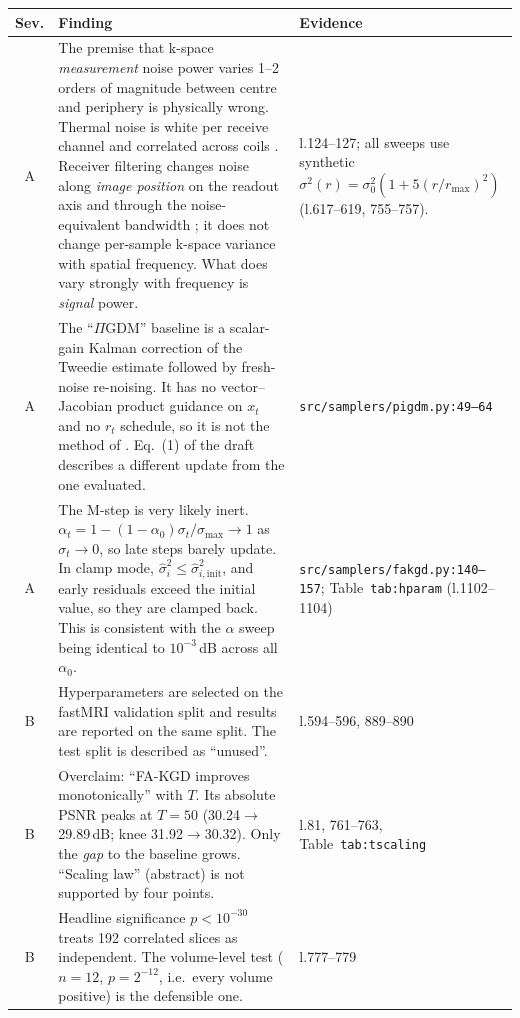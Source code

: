 \documentclass[10pt,a4paper]{article}
\newcommand{\pigdm}{$\Pi$GDM}
\newcommand{\code}[1]{\texttt{\small #1}}
\begin{document}
\begin{center}
\small
\begin{tabularx}{\linewidth}{@{}c L L@{}}
\toprule
Sev. & Finding & Evidence\\
\midrule
{}A & The premise that k-space \emph{measurement} noise power varies 1--2 orders of magnitude between centre and periphery is physically wrong. Thermal noise is white per receive channel and correlated across coils \cite{roemer1990phased,pruessmann1999sense}. Receiver filtering changes noise along \emph{image position} on the readout axis and through the noise-equivalent bandwidth \cite{kellman2005snr}; it does not change per-sample k-space variance with spatial frequency. What does vary strongly with frequency is \emph{signal} power. & l.124--127; all sweeps use synthetic $\sigma^2(r)=\sigma_0^2(1+5(r/r_{\max})^2)$ (l.617--619, 755--757).\\
A & The ``\pigdm'' baseline is a scalar-gain Kalman correction of the Tweedie estimate followed by fresh-noise re-noising. It has no vector--Jacobian product guidance on $x_t$ and no $r_t$ schedule, so it is not the method of \cite{song2023pigdm}. Eq.~(1) of the draft describes a different update from the one evaluated. & \code{src/samplers/pigdm.py:49--64}\\
A & The M-step is very likely inert. $\alpha_t=1-(1-\alpha_0)\sigma_t/\sigma_{\max}\to1$ as $\sigma_t\to0$, so late steps barely update. In clamp mode, $\hat\sigma_i^2\le\hat\sigma^2_{i,\mathrm{init}}$, and early residuals exceed the initial value, so they are clamped back. This is consistent with the $\alpha$ sweep being identical to $10^{-3}$\,dB across all $\alpha_0$. & \code{src/samplers/fakgd.py:140--157}; Table~\code{tab:hparam} (l.1102--1104)\\
B & Hyperparameters are selected on the fastMRI validation split and results are reported on the same split. The test split is described as ``unused''. & l.594--596, 889--890\\
B & Overclaim: ``FA-KGD improves monotonically'' with $T$. Its absolute PSNR peaks at $T{=}50$ (30.24$\to$29.89\,dB; knee 31.92$\to$30.32). Only the \emph{gap} to the baseline grows. ``Scaling law'' (abstract) is not supported by four points. & l.81, 761--763, Table~\code{tab:tscaling}\\
B & Headline significance $p<10^{-30}$ treats 192 correlated slices as independent. The volume-level test ($n{=}12$, $p{=}2^{-12}$, i.e.\ every volume positive) is the defensible one. & l.777--779\\

\end{tabularx}
\end{center}
\end{document}
